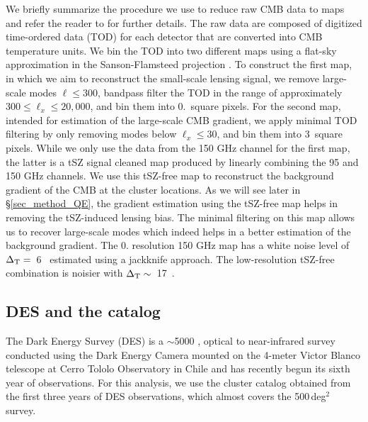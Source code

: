 We briefly summarize the procedure we use to reduce raw CMB data to maps and refer the reader to \cite{henning18} for further details. 
The raw data are composed of digitized time-ordered data (TOD) for each detector that are converted into CMB temperature units. %
We bin the TOD into two different maps using a flat-sky approximation in the Sanson-Flamsteed projection \citep{calabretta02, schaffer11}. 
To construct the first map, in which we aim to reconstruct the small-scale lensing signal, we remove large-scale modes $\ell \le 300$, bandpass filter the TOD in the range of approximately $300 \le \ell_{x} \le 20,000$, and bin them into 0.\ square pixels.
For the second map, intended for estimation of the large-scale CMB gradient, we apply minimal TOD filtering by only removing modes below $\ell_{x} \le 30$, and bin them into 3\am\ square pixels.
While we only use the data from the 150 GHz channel for the first map, the latter is a tSZ signal cleaned map produced by linearly combining the 95 and 150 GHz channels. 
We use this tSZ-free map to reconstruct the background gradient of the CMB at the cluster locations.
As we will see later in \S\ref{sec_method_QE}, the gradient estimation using the tSZ-free map helps in removing the tSZ-induced lensing bias.
The minimal filtering on this map allows us to recover large-scale modes which indeed helps in a better estimation of the background gradient.
The 0. resolution 150 GHz map has a white noise level of \mbox{$\Delta_{\rm T} = $ 6 \ukam} estimated using a jackknife approach. %
The low-resolution tSZ-free combination is noisier with \mbox{$\Delta_{\rm T} \sim $ 17 \ukam}.
\subsection{DES and the {\rm \RM} catalog}\label{sec_DES}
The Dark Energy Survey (DES) is a $\sim$5000 \sqdeg, optical to near-infrared survey conducted using the Dark Energy Camera \citep{flaugher15} mounted on the 4-meter Victor Blanco telescope at Cerro Tololo Observatory in Chile and has recently begun its sixth year of observations. 
For this analysis, we use the cluster catalog obtained from the first three years of DES observations, which almost covers the \sptpol{} 500\,deg$^{2}$ survey. 

